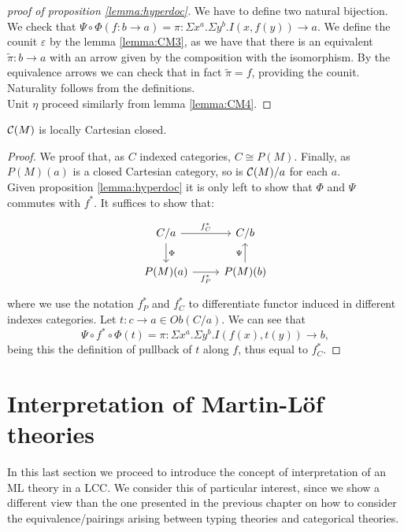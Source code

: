 \begin{proof}[proof of proposition \ref{lemma:hyperdoc}]
  We have to define two natural bijection. We check that $\Psi\circ\Phi(f:b\to a) = \pi: \Sigma x^a. \Sigma y^b.I(x,f(y)) \to a$. We define the counit $\varepsilon$ by the lemma \ref{lemma:CM3}, as we have that there is an equivalent $\tilde \pi : b \to a$ with an arrow given by the composition with the isomorphism. By the equivalence arrows we can check that in fact $\tilde \pi = f$, providing the counit. Naturality follows from the definitions.\\

  Unit $\eta$ proceed similarly from lemma \ref{lemma:CM4}.

\end{proof}
\begin{theorem}
  $\mathcal{C}(M)$ is locally Cartesian closed.
\end{theorem}
\begin{proof}
  We proof that, as $C$ indexed categories, $C\cong P(M)$. Finally, as $P(M)(a)$ is a closed Cartesian category, so is $\mathcal{C}(M)/a$ for each $a$.\\

  Given proposition \ref{lemma:hyperdoc} it is only left to show that $\Phi$ and $\Psi$ commutes with $f^*$. It suffices to show that:
  \[
    \begin{tikzpicture}
      \node {\begin{tikzcd}
          C/a \ar[d,"\Phi"]\ar[r,"f_C^*"] & C/b\\
          P(M)(a)\ar[r,swap,"f_P^*"] &   P(M)(b)\ar[u,"\Psi"]
        \end{tikzcd}};
    \end{tikzpicture}
  \]
  where we use the notation $f_P^*$ and $f_C^*$ to differentiate functor induced in different indexes categories.   Let $t:c\to a \in Ob(C/a)$. We can see that
  $$\Psi\circ f^*\circ \Phi(t) = \pi: \Sigma x^a. \Sigma y^b.I(f(x),t(y)) \to b,$$
  being this the definition of pullback of $t$ along $f$, thus equal to $f_C^*$.
\end{proof}


\section{Interpretation of Martin-L\"of theories}
\label{InterpretationLCC}
In this last section we proceed to introduce the concept of interpretation of an ML theory in a LCC. We consider this of particular interest, since we show a different view than the one presented in the previous chapter on how to consider the equivalence/pairings arising between typing theories and categorical theories.\\

